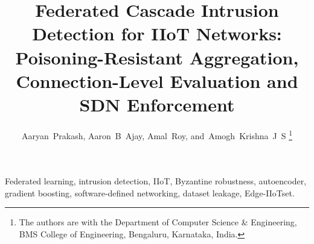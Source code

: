 \documentclass[journal]{IEEEtran}
\begin{document}
\title{Federated Cascade Intrusion Detection for IIoT Networks: Poisoning-Resistant Aggregation, Connection-Level Evaluation and SDN Enforcement}

\author{Aaryan~Prakash,
        Aaron~B~Ajay,
        Amal~Roy,
        and~Amogh~Krishna~J~S%
\thanks{The authors are with the Department of Computer Science \& Engineering, BMS College of Engineering, Bengaluru, Karnataka, India.}}


\maketitle

\begin{abstract}

\end{abstract}

\begin{IEEEkeywords}
Federated learning, intrusion detection, IIoT, Byzantine robustness, autoencoder, gradient boosting, software-defined networking, dataset leakage, Edge-IIoTset.
\end{IEEEkeywords}













\end{document}
